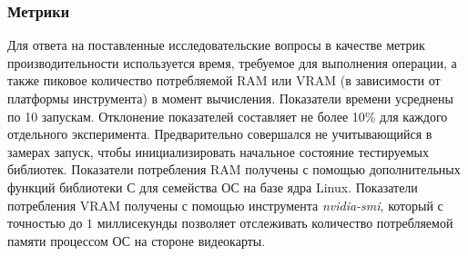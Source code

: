 \begin{table}
\begin{center}
\caption{RDF графы и графы программ для КС запросов}
\label{table:graphs_for_cfpq}
\scriptsize
{}
\end{center}
\end{table}

\subsubsection*{Метрики}

Для ответа на поставленные исследовательские вопросы в качестве метрик производительности используется время, требуемое для выполнения операции, а также пиковое количество потребляемой RAM или VRAM (в зависимости от платформы инструмента) в момент вычисления. 
Показатели времени усреднены по 10 запускам. 
Отклонение показателей составляет не более 10\% для каждого отдельного эксперимента.
Предварительно совершался не учитывающийся в замерах запуск, чтобы инициализировать начальное состояние тестируемых библиотек. 
Показатели потребления RAM получены с помощью дополнительных функций библиотеки С для семейства ОС на базе ядра Linux.  
Показатели потребления VRAM получены с помощью инструмента \textit{nvidia-smi}, который с точностью до $1$ миллисекунды позволяет отслеживать количество потребляемой памяти процессом ОС на стороне видеокарты. 

